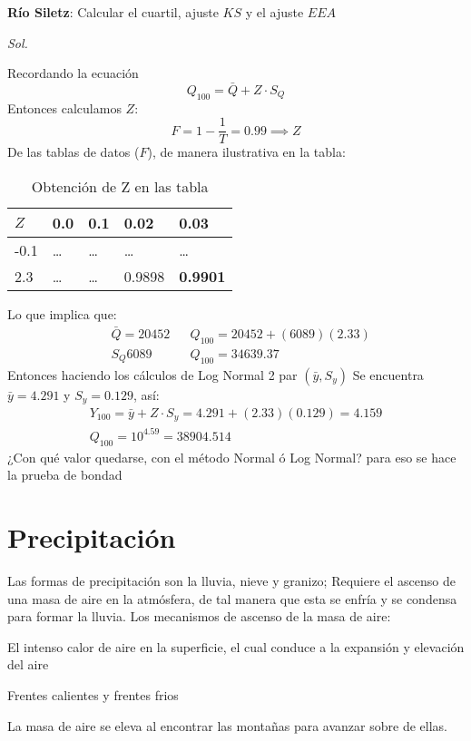 \begin{example}
    \textbf{Río Siletz}: Calcular el cuartil, ajuste $KS$ y el ajuste $EEA$
\end{example}

\textit{ Sol. }

Recordando la ecuación
\begin{equation*}
    Q_{100} =\bar{Q} + Z\cdot S_Q
\end{equation*}
Entonces calculamos $Z$:
\begin{equation*}
    F = 1 - \frac{1}{T} = 0.99\implies Z
\end{equation*}
De las tablas de datos ($F$), de manera ilustrativa en la tabla:
\begin{table}[h!]
    \centering
    \begin{tabular}{@{}lllll@{}}
    \toprule
    $Z$  & 0.0   & 0.1   & 0.02   & 0.03            \\ \midrule
    -0.1 & \dots & \dots & \dots  & \dots           \\
    2.3  & \dots & \dots & 0.9898 & \textbf{0.9901} \\ \bottomrule
    \end{tabular}
    \caption{Obtención de Z en las tabla }
    \label{tabhs3}
\end{table}
Lo que implica que:
\begin{align*}
    &\bar{Q} =20452&&Q_{100} =20452 +(6089)(2.33)\\
    &S_Q 6089&&Q_{100} = 34639.37
\end{align*}
Entonces haciendo los cálculos de Log Normal 2 par $(\bar{y},S_y)$
Se encuentra $\bar{y}=4.291$ y $S_y=0.129$, así:
\begin{align*}
    Y_{100} = \bar{y} + Z\cdot S_y = 4.291 + (2.33)(0.129) =4.159\\
    Q_{100} = 10^{4.59} = 38904.514
\end{align*}
¿Con qué valor quedarse, con el método Normal ó Log Normal? para eso se hace la prueba de bondad
\section{Precipitación}

Las formas de precipitación son la lluvia, nieve y granizo; Requiere el ascenso de una masa de aire en la atmósfera, de tal manera que esta se enfría y se condensa para formar la lluvia.
Los mecanismos de ascenso de la masa de aire:
\begin{definition}[Convectivo]
    El intenso calor de aire en la superficie, el cual conduce a la expansión y elevación del aire
\end{definition}
\begin{definition}
    Frentes calientes y frentes frios
\end{definition}
\begin{definition}[Orográfico]
    La masa de aire se eleva al encontrar las montañas para avanzar sobre de ellas.
\end{definition}
